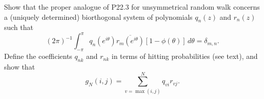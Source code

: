 Show that the proper analogue of P22.3 for unsymmetrical random walk concerns a (uniquely determined) biorthogonal system of polynomials \(q_n(z)\) and \(r_n(z)\) such that
\[
(2\pi)^{-1} \int_{-\pi}^{\pi} q_n(e^{i\theta}) \overline{r_m(e^{i\theta})} [1 - \phi(\theta)] \, d\theta = \delta_{m,n}.
\]
Define the coefficients \(q_{nk}\) and \(r_{nk}\) in terms of hitting probabilities (see text), and show that
\[
g_N(i,j) = \sum_{v=\max(i,j)}^{N} q_{vi} r_{vj}.
\]
